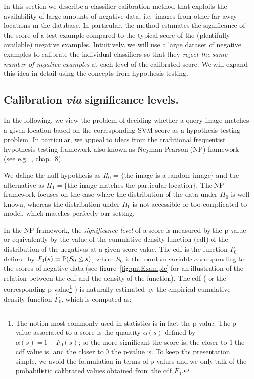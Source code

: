 In this section we describe a classifier calibration method that exploits the availability of large amounts of negative data, i.e.\ images from other far away locations in the database.
In particular, the method estimates the significance of the score of a test example compared to the typical score of  the (plentifully available) negative examples. Intuitively, we will use a large dataset of negative examples to calibrate the individual classifiers so that they {\em reject the same number of negative examples} at each level of the calibrated score.   We will expand this idea in detail using the concepts from hypothesis testing. %
   \subsection{Calibration \emph{via} significance levels.}
      In the following, we view  the problem of deciding whether a query image matches a given location based on the corresponding SVM score as a hypothesis testing problem. In particular, we appeal to ideas from the traditional frequentist hypothesis testing framework also known as Neyman-Pearson (NP) framework (see e.g.~\cite{casella2001statistical}, chap.~8).

      We define the null hypothesis as $H_0=\{$the image is a random image$\}$ and the alternative as $H_1=\{$the image matches the particular location$\}$. The NP framework focuses on the case where the distribution of the data under $H_0$ is well known, whereas the distribution under $H_1$ is not accessible or too complicated to model, which matches perfectly our setting.

      In the NP framework, the \emph{significance level} of a score is measured by the p-value or equivalently by the value of the cumulative density function  (cdf) of the distribution of the negatives at a given score value. The cdf is the function $F_0$ defined by $F_0(s)=\mathbb{P}(S_0\leq s)$, where $S_0$ is the random variable corresponding to the scores of negative data (see figure~\ref{fig:qntExample} for an illustration of the relation between the cdf and the density of the function). The cdf (
      or the corresponding p-value\footnote{
        The notion most commonly used in statistics is in fact the p-value. The p-value associated to a score is the quantity $\alpha(s)$ defined by $\alpha(s)=1-F_0(s)$; so the more significant the score is, the closer to $1$ the cdf value is, and the closer to $0$ the p-value is. To keep the presentation simple, we avoid the formulation in terms of p-values and we only talk of the probabilistic calibrated values obtained from the cdf $F_0$.
       }
       )
      is naturally estimated by the empirical cumulative density function $\hat{F}_0$, which is computed as: 
      
